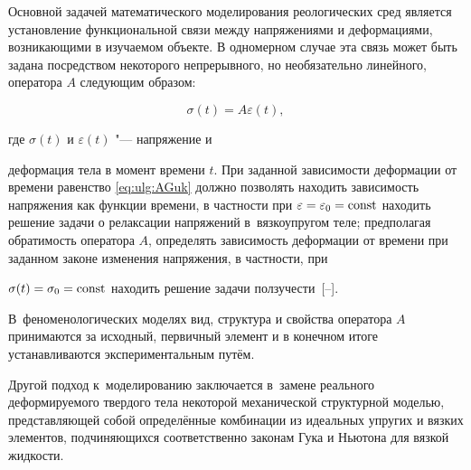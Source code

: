 \date{05/XI/2015} %









\makerutitle








Основной задачей математического моделирования реологических сред является установление функциональной связи между напряжениями и деформациями, возникающими в изучаемом объекте. В одномерном случае эта связь может быть задана посредством некоторого непрерывного, но необязательно линейного, оператора $A$ следующим образом:

\begin{equation}\label{eq:ulg:AGuk}

\sigma(t)=A\varepsilon(t),

\end{equation}

где $\sigma(t)$ и $\varepsilon(t)$  "---  напряжение и

деформация тела в момент времени $t$. При заданной зависимости деформации от времени равенство \eqref{eq:ulg:AGuk} должно позволять находить зависимость напряжения как функции времени, в частности при \mbox{$\varepsilon=\varepsilon_{0}=\rm const$} находить решение задачи о релаксации напряжений в~вязкоупругом теле; предполагая обратимость оператора $A$, определять зависимость деформации от времени при заданном законе изменения напряжения, в частности, при

$\sigma(t)=\sigma_{0}=\rm const$ находить решение задачи ползучести~[--]. 



В~феноменологических моделях вид, структура и свойства оператора $A$ принимаются за исходный, первичный элемент и в конечном итоге устанавливаются экспериментальным путём. 

Другой подход к~моделированию заключается в~замене реального деформируемого твердого тела некоторой механической структурной моделью, представляющей собой определённые комбинации из идеальных упругих и вязких элементов, подчиняющихся соответственно законам Гука и Ньютона для вязкой жидкости. 



